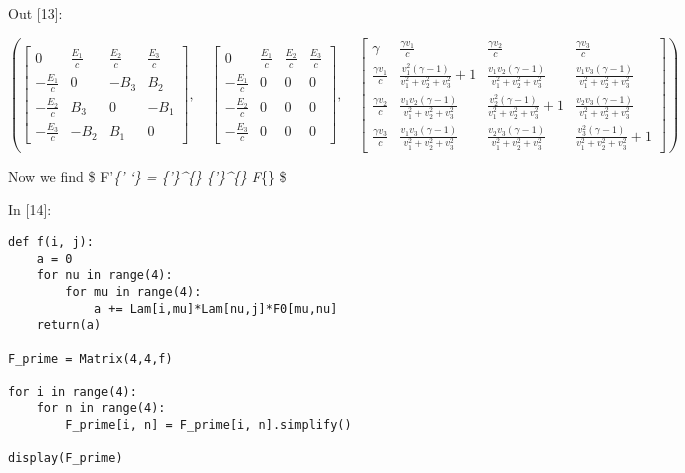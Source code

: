 \documentclass[11pt]{article}
\newif\ifcode
\newif\ifleftmargins
\newlength{\promptlength}
\newcommand{\prompt}[3]{
        \needspace{1.1cm}
        \settowidth{\promptlength}{ #1 [#3] }
        \ifleftmargins\hspace{-\promptlength}\hspace{-5pt}\fi
        {\color{#2}#1 [#3]:}
        \ifleftmargins\vspace{-2.7ex}\fi
    }
\begin{document}
            
\prompt{Out}{outcolor}{13}
    
    $$\left ( \left[\begin{matrix}0 & \frac{E_{1}}{c} & \frac{E_{2}}{c} & \frac{E_{3}}{c}\\- \frac{E_{1}}{c} & 0 & - B_{3} & B_{2}\\- \frac{E_{2}}{c} & B_{3} & 0 & - B_{1}\\- \frac{E_{3}}{c} & - B_{2} & B_{1} & 0\end{matrix}\right], \quad \left[\begin{matrix}0 & \frac{E_{1}}{c} & \frac{E_{2}}{c} & \frac{E_{3}}{c}\\- \frac{E_{1}}{c} & 0 & 0 & 0\\- \frac{E_{2}}{c} & 0 & 0 & 0\\- \frac{E_{3}}{c} & 0 & 0 & 0\end{matrix}\right], \quad \left[\begin{matrix}\gamma & \frac{\gamma v_{1}}{c} & \frac{\gamma v_{2}}{c} & \frac{\gamma v_{3}}{c}\\\frac{\gamma v_{1}}{c} & \frac{v_{1}^{2} \left(\gamma - 1\right)}{v_{1}^{2} + v_{2}^{2} + v_{3}^{2}} + 1 & \frac{v_{1} v_{2} \left(\gamma - 1\right)}{v_{1}^{2} + v_{2}^{2} + v_{3}^{2}} & \frac{v_{1} v_{3} \left(\gamma - 1\right)}{v_{1}^{2} + v_{2}^{2} + v_{3}^{2}}\\\frac{\gamma v_{2}}{c} & \frac{v_{1} v_{2} \left(\gamma - 1\right)}{v_{1}^{2} + v_{2}^{2} + v_{3}^{2}} & \frac{v_{2}^{2} \left(\gamma - 1\right)}{v_{1}^{2} + v_{2}^{2} + v_{3}^{2}} + 1 & \frac{v_{2} v_{3} \left(\gamma - 1\right)}{v_{1}^{2} + v_{2}^{2} + v_{3}^{2}}\\\frac{\gamma v_{3}}{c} & \frac{v_{1} v_{3} \left(\gamma - 1\right)}{v_{1}^{2} + v_{2}^{2} + v_{3}^{2}} & \frac{v_{2} v_{3} \left(\gamma - 1\right)}{v_{1}^{2} + v_{2}^{2} + v_{3}^{2}} & \frac{v_{3}^{2} \left(\gamma - 1\right)}{v_{1}^{2} + v_{2}^{2} + v_{3}^{2}} + 1\end{matrix}\right]\right )$$

    

    Now we find \$ F'\emph{\{\mu' \nu`\} = \Lambda\emph{\{\mu'\}\^{}\{\mu\}
\Lambda}\{\nu'\}\^{}\{\nu\} F}\{\mu \nu\} \$

    
\prompt{In}{incolor}{14}
\codetrue
\begin{tcolorbox}[breakable, size=fbox, boxrule=1pt, pad at break*=1mm, colback=cellbackground, colframe=cellborder]
\begin{verbatim}
def f(i, j):
    a = 0
    for nu in range(4):
        for mu in range(4):
            a += Lam[i,mu]*Lam[nu,j]*F0[mu,nu]
    return(a)

F_prime = Matrix(4,4,f)

for i in range(4):
    for n in range(4):
        F_prime[i, n] = F_prime[i, n].simplify()
        
display(F_prime)
\end{verbatim}
\end{tcolorbox}
\codefalse
\end{document}

